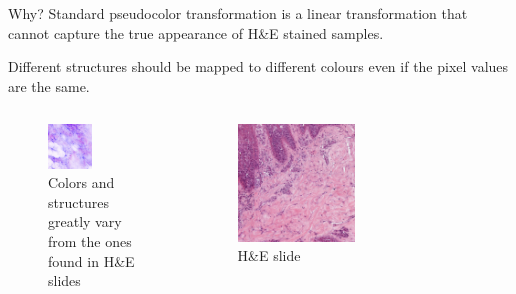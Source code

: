\documentclass[t]{beamer}
\begin{document}
\begin{frame}{Why?}
Standard pseudocolor transformation is a linear transformation that cannot capture the true appearance of H\&E stained samples.

Different structures should be mapped to different colours even if the pixel values are the same.

\begin{columns}

\begin{column}{0.5\textwidth}
\begin{figure}
\centering
\includegraphics[width=0.5\textwidth]{epoch246_real_A}
\caption{Colors and structures greatly vary from the ones found in H\&E slides}
\end{figure}
\end{column}

\begin{column}{0.5\textwidth}
\begin{figure}
\centering
\includegraphics[width=0.5\textwidth]{HE-2}
\caption{H\&E slide}
\end{figure}
\end{column}

\end{columns}

\end{frame}
\end{document}
